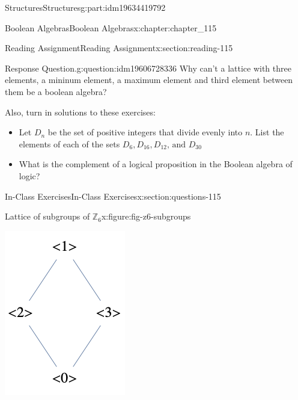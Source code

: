\documentclass[oneside,10pt,]{book}
\numberwithin{equation}{section}
\begin{document}
\begin{partptx}{Structures}{}{Structures}{}{}{g:part:idm19634419792}
\begin{chapterptx}{Boolean Algebras}{}{Boolean Algebras}{}{}{x:chapter:chapter_115}
\begin{sectionptx}{Reading Assignment}{}{Reading Assignment}{}{}{x:section:reading-115}
\begin{question}{Response Question.}{g:question:idm19606728336}%
Why can't a lattice with three elements, a mininum element, a maximum element and third element between them be a boolean algebra?%
\end{question}
Also, turn in solutions to these exercises:%
\begin{itemize}[label=\textbullet]
\item{}Let \(D_n\) be the set of positive integers that divide evenly into \(n\).  List the elements of each of the sets \(D_{6}, D_{16}, D_{12}\textrm{, and }D_{30}\)%
\item{}What is the complement of a logical proposition in the Boolean algebra of logic?%
\end{itemize}
%
\end{sectionptx}
%
%
\typeout{************************************************}
\typeout{************************************************}
%
\begin{sectionptx}{In-Class Exercises}{}{In-Class Exercises}{}{}{x:section:questions-115}
\begin{figureptx}{Lattice of subgroups of \(\mathbb{Z}_{6}\)}{x:figure:fig-z6-subgroups}{}%
\begin{image}{0.3}{0.4}{0.3}%
\includegraphics[width=\linewidth]{images/fig-z6-subgroups.png}

\end{image}
\end{figureptx}
\end{sectionptx}
\end{chapterptx}
\end{partptx}
\end{document}
